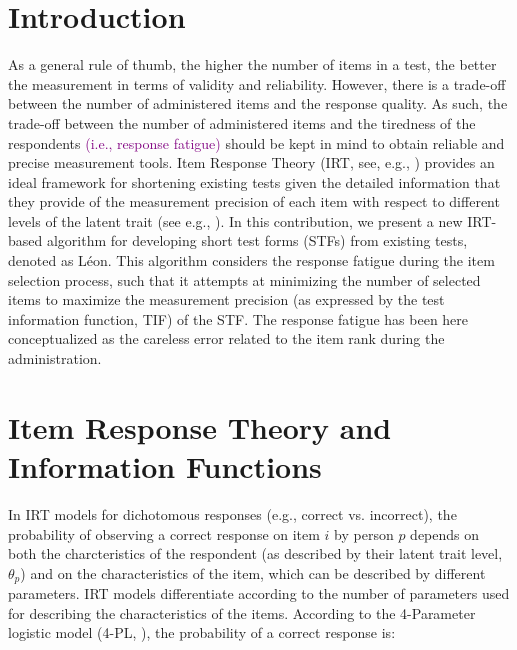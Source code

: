 \documentclass{svproc}
\newcommand{\ottavia}[1]{\textcolor{purple}{#1}}
\begin{document}
\section{Introduction}
%
As a general rule of thumb, the higher the number of items in a test, the better the measurement in terms of validity and reliability. However, there is a trade-off between the number of administered items and the response quality. As such, the trade-off between the number of administered items and the tiredness of the respondents \ottavia{(i.e., response fatigue)} should be kept in mind to obtain reliable and precise measurement tools. Item Response Theory (IRT, see, e.g., \cite{baker}) provides an ideal framework for shortening existing tests given the detailed information that they provide of the measurement precision of each item with respect to different levels of the latent trait (see e.g., \cite{pauci}). 
In this contribution, we present a new IRT-based algorithm for developing short test forms (STFs) from existing tests, denoted as Léon. This algorithm considers the response fatigue during the item selection process, such that it attempts at minimizing the number of selected items to maximize the measurement precision (as expressed by the test information function, TIF) of the STF.
The response fatigue has been here conceptualized as the careless error related to the item rank during the administration. 

\section{Item Response Theory and Information Functions}  

In IRT models for dichotomous responses (e.g., correct vs. incorrect), the probability of observing a correct response on item $i$ by person $p$ depends on both the charcteristics of the respondent (as described by their latent trait level, $\theta_p$) and on the characteristics of the item, which can be described by different parameters. IRT models differentiate according to the number of parameters used for describing the characteristics of the items. According to the 4-Parameter logistic model (4-PL, \cite{barton:4pl}), the probability of a correct response is: 
\end{document}

